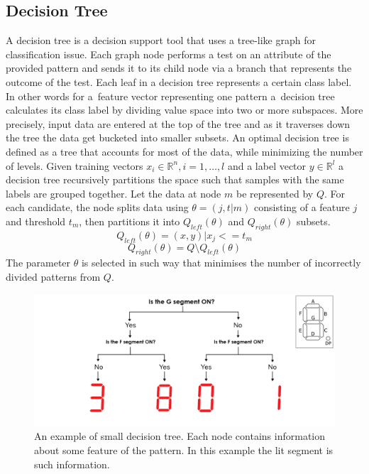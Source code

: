 \subsection{Decision Tree}
A decision tree is a decision support tool that uses a tree-like graph for classification issue. Each graph node performs a test on an attribute of the provided pattern and sends it to its child node via a branch that represents the outcome of the test. Each leaf in a decision tree represents a certain class label. In other words for a~feature vector representing one pattern a~decision tree calculates its class label by dividing value space into two or more subspaces. More precisely, input data are entered at the top of the tree and as it traverses down the tree the data get bucketed into smaller subsets. An optimal decision tree is defined as a tree that accounts for most of the data, while minimizing the number of levels\cite{RQuinlan}. Given training vectors $x_{i} \in \mathbb{R}^{n}, i=1,\dots,l$ and a label vector $y \in \mathbb{R}^{l}$ a decision tree recursively partitions the space such that samples with the same labels are grouped together. Let the data at node $m$ be represented by $Q$. For each candidate, the node splits data using $\theta = (j, t|{m})$ consisting of a feature $j$ and threshold $t_{m}$, then partitions it into $Q_{left}(\theta)$ and $Q_{right}(\theta)$ subsets. \[Q_{left}(\theta) = (x, y)|x_{j} <= t_{m}\] \[Q_{right}(\theta) = Q \setminus Q_{left}(\theta) \] The parameter $\theta$ is selected in such way that minimises the number of incorrectly divided patterns from $Q$.

\begin{figure}[htp]
	\centering
	\includegraphics[width=1.0\textwidth]{Figures/rf_visualization_funny.jpg}
	\caption{An example of small decision tree. Each node contains information about some feature of the pattern. In this example the lit segment is such information.}
	\label{fig:rf_visualization_funny}\vspace{-3pt}
\end{figure}

